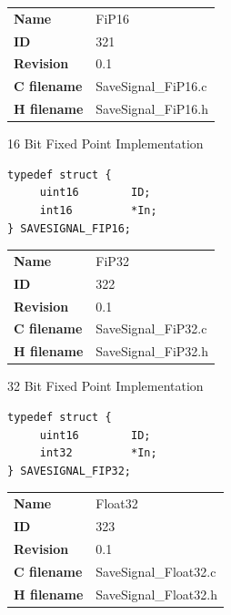 \ifdefined \AddTestReports
{}
\fi
{}
\nopagebreak[0]
\begin{tabular}{l l}
\textbf{Name} & FiP16 \tabularnewline
\textbf{ID} & 321 \tabularnewline
\textbf{Revision} & 0.1 \tabularnewline
\textbf{C filename} & SaveSignal\_FiP16.c \tabularnewline
\textbf{H filename} & SaveSignal\_FiP16.h \tabularnewline
\end{tabular}
\vspace{1ex}

16 Bit Fixed Point Implementation

\begin{lstlisting}
typedef struct {
     uint16        ID;
     int16         *In;
} SAVESIGNAL_FIP16;
\end{lstlisting}

\ifdefined \AddTestReports
{}
\fi
{}
\nopagebreak[0]
\begin{tabular}{l l}
\textbf{Name} & FiP32 \tabularnewline
\textbf{ID} & 322 \tabularnewline
\textbf{Revision} & 0.1 \tabularnewline
\textbf{C filename} & SaveSignal\_FiP32.c \tabularnewline
\textbf{H filename} & SaveSignal\_FiP32.h \tabularnewline
\end{tabular}
\vspace{1ex}

32 Bit Fixed Point Implementation

\begin{lstlisting}
typedef struct {
     uint16        ID;
     int32         *In;
} SAVESIGNAL_FIP32;
\end{lstlisting}

\ifdefined \AddTestReports
{}
\fi
{}
\nopagebreak[0]
\begin{tabular}{l l}
\textbf{Name} & Float32 \tabularnewline
\textbf{ID} & 323 \tabularnewline
\textbf{Revision} & 0.1 \tabularnewline
\textbf{C filename} & SaveSignal\_Float32.c \tabularnewline
\textbf{H filename} & SaveSignal\_Float32.h \tabularnewline
\end{tabular}
\vspace{1ex}

